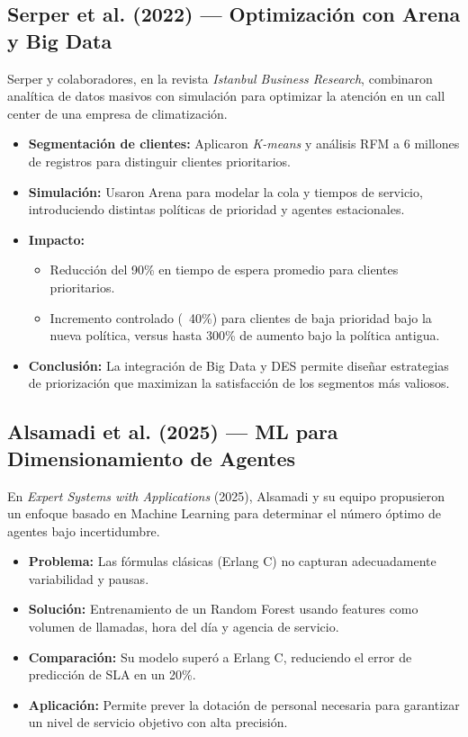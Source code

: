 \documentclass[12pt]{article}
\begin{document}
\subsection{Serper et al. (2022) — Optimización con Arena y Big Data}
Serper y colaboradores, en la revista \emph{Istanbul Business Research}, combinaron analítica de datos masivos con simulación para optimizar la atención en un call center de una empresa de climatización.  
\begin{itemize}
  \item \textbf{Segmentación de clientes:} Aplicaron \emph{K-means} y análisis RFM a 6 millones de registros para distinguir clientes prioritarios.  
  \item \textbf{Simulación:} Usaron Arena para modelar la cola y tiempos de servicio, introduciendo distintas políticas de prioridad y agentes estacionales.  
  \item \textbf{Impacto:} 
    \begin{itemize}
      \item Reducción del 90\% en tiempo de espera promedio para clientes prioritarios.
      \item Incremento controlado (~40\%) para clientes de baja prioridad bajo la nueva política, versus hasta 300\% de aumento bajo la política antigua.
    \end{itemize}
  \item \textbf{Conclusión:} La integración de Big Data y DES permite diseñar estrategias de priorización que maximizan la satisfacción de los segmentos más valiosos.
\end{itemize}

\subsection{Alsamadi et al. (2025) — ML para Dimensionamiento de Agentes}
En \emph{Expert Systems with Applications} (2025), Alsamadi y su equipo propusieron un enfoque basado en Machine Learning para determinar el número óptimo de agentes bajo incertidumbre.  
\begin{itemize}
  \item \textbf{Problema:} Las fórmulas clásicas (Erlang C) no capturan adecuadamente variabilidad y pausas.  
  \item \textbf{Solución:} Entrenamiento de un Random Forest usando features como volumen de llamadas, hora del día y agencia de servicio.  
  \item \textbf{Comparación:} Su modelo superó a Erlang C, reduciendo el error de predicción de SLA en un 20\%.  
  \item \textbf{Aplicación:} Permite prever la dotación de personal necesaria para garantizar un nivel de servicio objetivo con alta precisión.
\end{itemize}
\end{document}
